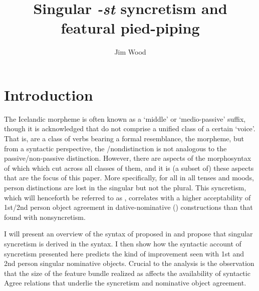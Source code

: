 \documentclass[output=paper]{langscibook}
\author{Jim Wood\affiliation{Yale University}}
\title{Singular \textit{-st} syncretism and featural pied-piping}
\begin{document}
\maketitle

\section{Introduction}\label{woodsecexs}

The Icelandic \sti morpheme is often known as a `middle' or `medio-passive' suffix, though it is acknowledged that \stvs do not comprise a unified class of a certain `voice'. That is, \stvs are a class of verbs bearing a formal resemblance, the \sti morpheme, but from a syntactic perspective, the \stin/non\sti distinction is not analogous to the passive/non-passive distinction.  However, there are aspects of the morphosyntax of \stvs which which cut across all classes of them, and it is (a subset of) these aspects that are the focus of this paper. More specifically, for all \stvs in all tenses and moods, person distinctions are lost in the singular but not the plural. This syncretism, which will henceforth be referred to as , correlates with a higher acceptability of 1st/2nd person object agreement in dative-nominative (\datnomn) constructions than that found with non\sti syncretism.  %
 
I will present an overview of the syntax of \sti proposed in  \citet{wood:refl,Wood2015book} and propose that singular \sti syncretism is derived in the syntax. I then show how the syntactic account of \sti syncretism presented here predicts the kind of improvement seen with 1st and 2nd person singular nominative objects. Crucial to the analysis is the observation that the size of the feature bundle realized as \sti affects the availability of syntactic Agree relations that underlie the syncretism and nominative object agreement. 


\end{document}
